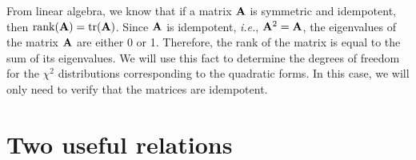 \documentclass[12pt]{article}
\theoremstyle{definition}
\begin{document}
    From linear algebra, we know that if a matrix \({\bf A}\) is symmetric and idempotent,
    then \({\rm rank}({\bf A}) = {\rm tr}({\bf A})\). Since \({\bf A}\) is idempotent, {\it i.e.},
    \({\bf A}^2 = {\bf A}\), the eigenvalues of the matrix \({\bf A}\) are either 0 or 1. Therefore,
    the rank of the matrix is equal to the sum of its eigenvalues. We will use this fact to determine
    the degrees of freedom for the \(\chi^2\) distributions corresponding to the quadratic forms.
    In this case, we will only need to verify that the matrices are idempotent.

  \section{Two useful relations}

\begin{thebibliography}{99}
\end{thebibliography}
\end{document}
